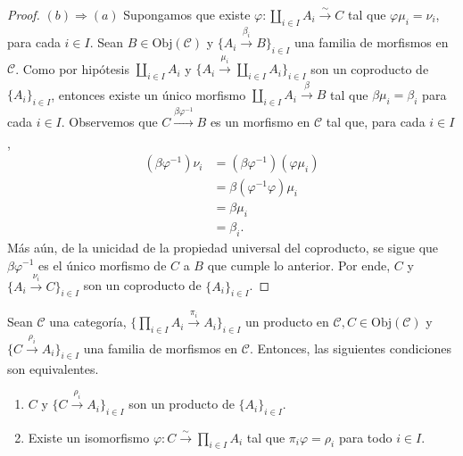 \documentclass[tesis]{subfiles}
\begin{document}
\begin{proof}
    $(b)\Rightarrow(a)$ Supongamos que existe $\varphi:\coprod_{i\in I}A_i\xrightarrow[]{\sim}C$ tal que $\varphi\mu_i=\nu_i$, para cada $i\in I$. Sean $B\in\text{Obj}(\mathscr{C})$ y $\{A_i\xrightarrow[]{\beta_i} B\}_{i\in I}$ una familia de morfismos en $\mathscr{C}$. Como por hipótesis $\coprod_{i\in I}A_i$ y $\{A_i\xrightarrow[]{\mu_i} \coprod_{i\in I}A_i\}_{i\in I}$ son un coproducto de $\{A_i\}_{i\in I}$, entonces existe un único morfismo $\coprod_{i\in I}A_i\xrightarrow[]{\beta} B$ tal que $\beta\mu_i=\beta_i$ para cada $i\in I$. Observemos que $C\xrightarrow[]{\beta\varphi^{-1}} B$ es un morfismo en $\mathscr{C}$ tal que, para cada $i\in I$,
    \begin{align*}
        (\beta\varphi^{-1})\nu_i &= (\beta\varphi^{-1})(\varphi\mu_i) \\
                                 &= \beta(\varphi^{-1}\varphi)\mu_i \\
                                 &= \beta\mu_i \\
                                 &= \beta_i.
    \end{align*}
    Más aún, de la unicidad de la propiedad universal del coproducto, se sigue que $\beta\varphi^{-1}$ es el único morfismo de $C$ a $B$ que cumple lo anterior. Por ende, $C$ y $\{A_i\xrightarrow[]{\nu_i} C\}_{i\in I}$ son un coproducto de $\{A_i\}_{i\in I}$.
\end{proof}

\begin{Prop}\label{Mendoza-Ejer.42*}
    Sean $\mathscr{C}$ una categoría, $\{\prod_{i\in I}A_i\xrightarrow[]{\pi_i} A_i\}_{i\in I}$ un producto en $\mathscr{C}, C\in\text{Obj}(\mathscr{C})$ y $\{C\xrightarrow[]{\rho_i} A_i\}_{i\in I}$ una familia de morfismos en $\mathscr{C}$. Entonces, las siguientes condiciones son equivalentes.

    \begin{enumerate}[label=(\alph*)]
    
        \item $C$ y $\{C\xrightarrow[]{\rho_i} A_i\}_{i\in I}$ son un producto de $\{A_i\}_{i\in I}$.

        \item Existe un isomorfismo $\varphi:C\xrightarrow[]{\sim}\prod_{i\in I}A_i$ tal que $\pi_i\varphi=\rho_i$ para todo $i\in I$.
    \end{enumerate}
\end{Prop}
\end{document}

